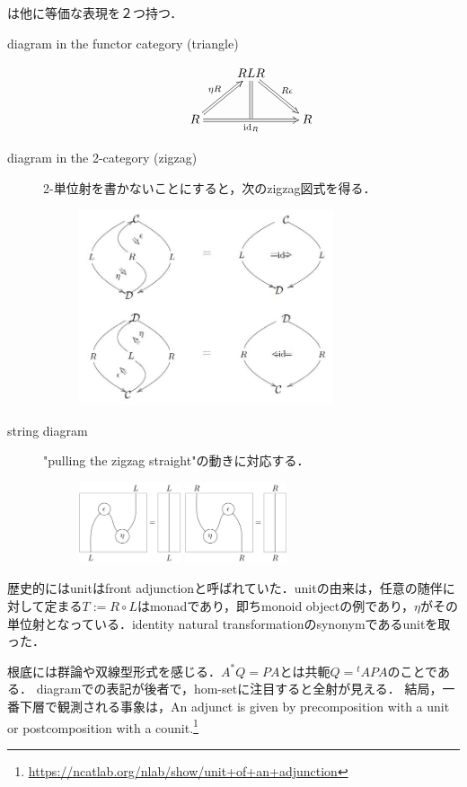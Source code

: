 \documentclass[uplatex,dvipdfmx]{jsreport}
\begin{document}
\begin{remark}
    は他に等価な表現を２つ持つ．
    \begin{description}
        \item[diagram in the functor category (triangle)] 
        \[\xymatrix{
            &RLR\ar@{=>}[dr]^-{R\epsilon}\ar@{=}[d]\\
            R\ar@{=>}[rr]_-{\id_R}\ar@{=>}[ur]^-{\eta R}&{}&R
        }\]
        \item[diagram in the 2-category (zigzag)]
        2-単位射を書かないことにすると，次のzigzag図式を得る．
        \begin{figure}[h]
            \includegraphics[width=7.5cm]{Adjointness.jpg}
        \end{figure}
        \item[string diagram]
        "pulling the zigzag straight"の動きに対応する．
        \begin{figure}[h]
            \includegraphics[width=3cm]{adjunction-up-string.png}
            \includegraphics[width=3cm]{adjunction-down-string.png}
        \end{figure}
    \end{description}
\end{remark}
\begin{remark}
    歴史的にはunitはfront adjunctionと呼ばれていた．unitの由来は，任意の随伴に対して定まる$T:=R\circ L$はmonadであり，即ちmonoid objectの例であり，$\eta$がその単位射となっている．identity natural transformationのsynonymであるunitを取った．
\end{remark}
\begin{remarks}
    根底には群論や双線型形式を感じる．$A^*Q=PA$とは共軛$Q={}^t\!APA$のことである．
    diagramでの表記が後者で，hom-setに注目すると全射が見える．
    結局，一番下層で観測される事象は，An adjunct is given by precomposition with a unit or postcomposition with a counit.\footnote{\url{https://ncatlab.org/nlab/show/unit+of+an+adjunction}}
\end{remarks}
\end{document}
